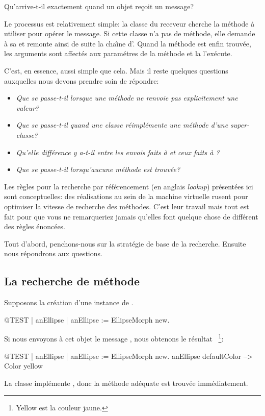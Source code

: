\documentclass[a4paper,10pt,twoside]{book}
\begin{document}

Qu'arrive-t-il exactement quand un objet re\c{c}oit un message?

Le processus est relativement simple:
la classe du receveur cherche la m\'ethode \`a utiliser pour
op\'erer le message.
Si cette classe n'a pas de m\'ethode, elle demande \`a sa  et remonte ainsi de suite la cha\^{\i}ne d'.
Quand la m\'ethode est enfin trouv\'ee, les arguments sont affect\'es aux param\'etres de la m\'ethode et la  l'ex\'ecute.

C'est, en essence, aussi simple que cela.
Mais il reste quelques questions auxquelles nous devons prendre soin de r\'epondre:

\begin{itemize}
  \item \emph{Que se passe-t-il lorsque une m\'ethode ne renvoie pas explicitement une valeur?}
  \item \emph{Que se passe-t-il quand une classe r\'eimpl\'emente une m\'ethode d'une super-classe?}
  \item \emph{Qu'elle diff\'erence y a-t-il entre les envois faits \`a  et ceux faits \`a ?}
  \item \emph{Que se passe-t-il lorsqu'aucune m\'ethode est trouv\'ee?}
\end{itemize}

Les r\`egles pour la recherche par r\'ef\'erencement (en anglais \emph{lookup}) pr\'esent\'ees ici sont conceptuelles: des r\'ealisations au sein de la machine virtuelle rusent pour optimiser la vitesse de recherche des m\'ethodes. 
C'est leur travail mais tout est fait pour que vous ne remarqueriez jamais qu'elles font quelque chose de diff\'erent des r\`egles \'enonc\'ees.

Tout d'abord, penchons-nous sur la strat\'egie de base de la recherche. Ensuite
nous r\'epondrons aux questions.

\subsection{La recherche de m\'ethode}
Supposons la cr\'eation d'une instance de .
\begin{code}{@TEST | anEllipse |}
anEllipse := EllipseMorph new.
\end{code}
\noindent
Si nous envoyons \`a cet objet le message , nous obtenons le r\'esultat ~\footnote{Yellow est la couleur jaune.}:
\begin{code}{@TEST | anEllipse | anEllipse := EllipseMorph new.}
anEllipse defaultColor --> Color yellow
\end{code}
\noindent
La classe  impl\'emente , donc la m\'ethode ad\'equate est trouv\'ee imm\'ediatement.
\end{document}
